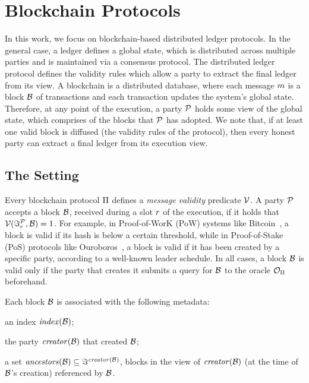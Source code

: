 \section{Blockchain Protocols}\label{sec:blockchains}

In this work, we focus on blockchain-based distributed ledger protocols.  In
the general case, a ledger defines a global state, which is distributed across
multiple parties and is maintained via a consensus protocol. The distributed
ledger protocol defines the validity rules which allow a party to extract the
final ledger from its view. A
blockchain is a distributed database, where each message $m$ is a block
$\mathcal{B}$ of transactions and each transaction updates the system's global
state. Therefore, at any point of the execution, a party $\mathcal{P}$ holds some view of
the global state, which comprises of the blocks that $\mathcal{P}$ has
adopted. We note that, if at least one valid block is diffused (\wrt the
validity rules of the protocol), then every honest party can
extract a final ledger from its execution view.

\subsection{The Setting}\label{subsec:setting}

Every blockchain protocol $\Pi$ defines a \emph{message validity} predicate
$\mathcal{V}$.  A party $\mathcal{P}$ accepts a block $\mathcal{B}$,
received during a slot $r$ of the execution, if it holds that
$\mathcal{V}(\Im^{\mathcal{P}}_r, \mathcal{B}) = 1$. For
example, in Proof-of-WorK (PoW) systems like
Bitcoin~\cite{nakamoto2008bitcoin}, a block is valid if its hash is below a
certain threshold, while in Proof-of-Stake (PoS) protocols like
Ouroboros~\cite{C:KRDO17}, a block is valid if it has been created by a
specific party, according to a well-known leader schedule. In all cases, a
block $\mathcal{B}$ is valid only if the party that creates it submits a query for
$\mathcal{B}$ to the oracle $\mathcal{O}_\Pi$ beforehand.

Each block $\mathcal{B}$ is associated with the following metadata:
\begin{inparaenum}[i)]
    \item an index $\mathit{index}(\mathcal{B})$;
    \item the party $\mathit{creator}(\mathcal{B})$ that created $\mathcal{B}$;
    \item a set $\mathit{ancestors}(\mathcal{B}) \subseteq
    \Im^{\mathit{creator}(\mathcal{B})}$, \ie blocks in the view of
    $\mathit{creator}(\mathcal{B})$ (at the time of $\mathcal{B}$'s creation)
    referenced by $\mathcal{B}$.
\end{inparaenum}

